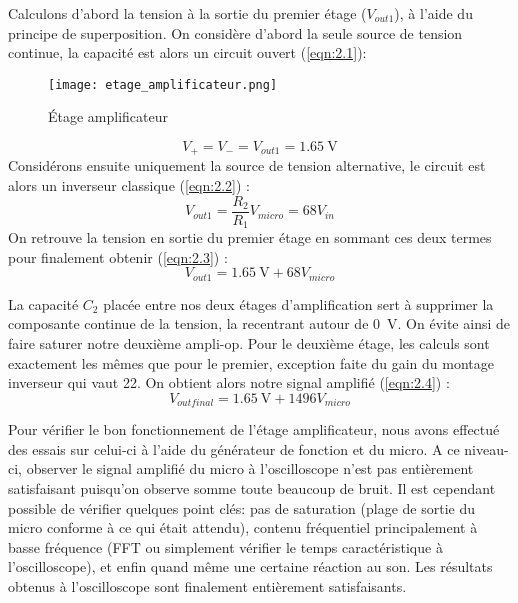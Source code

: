 Calculons d'abord la tension à la sortie du premier étage ($V_{out 1}$), à l'aide du principe de superposition. On considère d'abord la seule source de tension continue, la capacité est alors un circuit ouvert (\ref{eqn:2.1}):
\begin{figure}[htbp]
\centering
\texttt{[image: etage\_amplificateur.png]}
\caption{Étage amplificateur}
\label{fig:etage amplificateur}
\end{figure}
\begin{equation}
V_{+} = V_{-} = V_{out 1} = \SI{1.65}{\volt}
\label{eqn:2.1}
\end{equation}
Considérons ensuite uniquement la source de tension alternative, le circuit est alors un inverseur classique (\ref{eqn:2.2}) :
\begin{equation}
V_{out 1} = \frac{R_2}{R_1} V_{micro} = 68 V_{in}
\label{eqn:2.2}
\end{equation}
On retrouve la tension en sortie du premier étage en sommant ces deux termes pour finalement obtenir (\ref{eqn:2.3}) :
\begin{equation}
V_{out 1} = \SI{1.65}{\volt} + 68 V_{micro}
\label{eqn:2.3}
\end{equation}

La capacité $C_{2}$ placée entre nos deux étages d'amplification sert à supprimer la composante continue de la tension, la recentrant autour de \SI{0}{\volt}. On évite ainsi de faire saturer notre deuxième ampli-op. Pour le deuxième étage, les calculs sont exactement les mêmes que pour le premier, exception faite du gain du montage inverseur qui vaut 22. On obtient alors notre signal amplifié (\ref{eqn:2.4}) :
\begin{equation}
V_{out final} = \SI{1.65}{\volt} + 1496 V_{micro}
\label{eqn:2.4}
\end{equation}

Pour vérifier le bon fonctionnement de l'étage amplificateur, nous avons effectué des essais sur celui-ci à l'aide du générateur de fonction et du micro. A ce niveau-ci, observer le signal amplifié du micro à l'oscilloscope n'est pas entièrement satisfaisant puisqu'on observe somme toute beaucoup de bruit. Il est cependant possible de vérifier quelques point clés: pas de saturation (plage de sortie du micro conforme à ce qui était attendu), contenu fréquentiel principalement à basse fréquence (FFT ou simplement vérifier le temps caractéristique à l'oscilloscope), et enfin quand même une certaine réaction au son. Les résultats obtenus à l'oscilloscope sont finalement entièrement satisfaisants.

